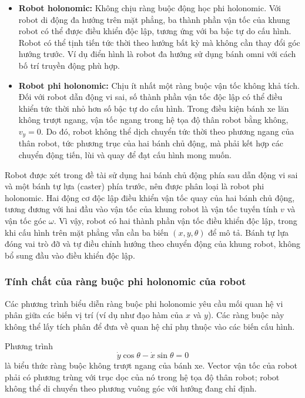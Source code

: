 \documentclass[12pt,a4paper,oneside]{report}
\begin{document}
\begin{itemize}
  \item \textbf{Robot holonomic:} Không chịu ràng buộc động học phi holonomic. Với robot di động đa hướng trên mặt phẳng, ba thành phần vận tốc của khung robot có thể được điều khiển độc lập, tương ứng với ba bậc tự do cấu hình. Robot có thể tịnh tiến tức thời theo hướng bất kỳ mà không cần thay đổi góc hướng trước. Ví dụ điển hình là robot đa hướng sử dụng bánh omni với cách bố trí truyền động phù hợp.
  \item \textbf{Robot phi holonomic:} Chịu ít nhất một ràng buộc vận tốc không khả tích. Đối với robot dẫn động vi sai, số thành phần vận tốc độc lập có thể điều khiển tức thời nhỏ hơn số bậc tự do cấu hình. Trong điều kiện bánh xe lăn không trượt ngang, vận tốc ngang trong hệ tọa độ thân robot bằng không, \(v_y=0\). Do đó, robot không thể dịch chuyển tức thời theo phương ngang của thân robot, tức phương trục của hai bánh chủ động, mà phải kết hợp các chuyển động tiến, lùi và quay để đạt cấu hình mong muốn.
\end{itemize}

Robot được xét trong đề tài sử dụng hai bánh chủ động phía sau dẫn động vi sai và một bánh tự lựa (caster) phía trước, nên được phân loại là robot phi holonomic. Hai động cơ độc lập điều khiển vận tốc quay của hai bánh chủ động, tương đương với hai đầu vào vận tốc của khung robot là vận tốc tuyến tính \(v\) và vận tốc góc \(\omega\). Vì vậy, robot có hai thành phần vận tốc điều khiển độc lập, trong khi cấu hình trên mặt phẳng vẫn cần ba biến \((x,y,\theta)\) để mô tả. Bánh tự lựa đóng vai trò đỡ và tự điều chỉnh hướng theo chuyển động của khung robot, không bổ sung đầu vào điều khiển độc lập.

\subsubsection{Tính chất của ràng buộc phi holonomic của robot}

Các phương trình biểu diễn ràng buộc phi holonomic yêu cầu mối quan hệ vi phân giữa các biến vị trí (ví dụ như đạo hàm của \(x\) và \(y\)). Các ràng buộc này không thể lấy tích phân để đưa về quan hệ chỉ phụ thuộc vào các biến cấu hình.

Phương trình
\[
  \dot{y}\cos\theta-\dot{x}\sin\theta=0
\]
là biểu thức ràng buộc không trượt ngang của bánh xe. Vector vận tốc của robot phải có phương trùng với trục dọc của nó trong hệ tọa độ thân robot; robot không thể di chuyển theo phương vuông góc với hướng đang chỉ định.
\end{document}
